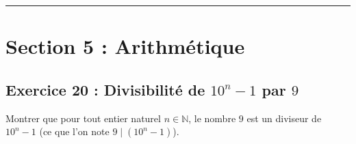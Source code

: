 \documentclass[11pt,a4paper]{article}
\newcommand{\N}{\mathbb{N}}
\begin{document}
\vspace{1cm}
\hrule
\vspace{1cm}
\section{Section 5 : Arithmétique}

\subsection*{Exercice 20 : Divisibilité de $10^n - 1$ par $9$}

Montrer que pour tout entier naturel $n \in \N$, le nombre $9$ est un diviseur de $10^n - 1$ (ce que l'on note $9 \mid (10^n - 1)$).
\end{document}

